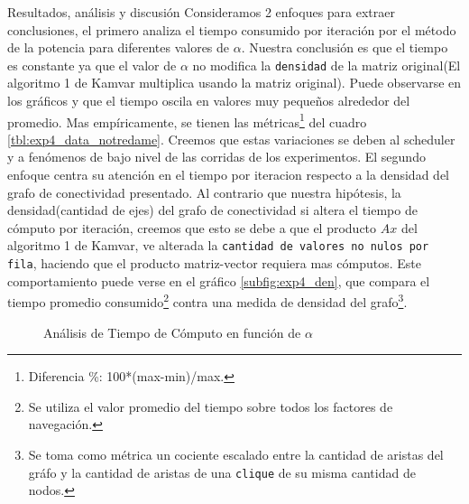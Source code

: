 \begin{LaTeXdescription}
    \item[Resultados, an\'alisis y discusi\'on]
        Consideramos 2 enfoques para extraer conclusiones, el primero analiza el
        tiempo consumido por iteración por el método de la potencia para diferentes
        valores de $\alpha$. Nuestra conclusión es que el tiempo es constante ya que
        el valor de $\alpha$ no modifica la \texttt{densidad} de la matriz
        original(El algoritmo 1 de Kamvar multiplica usando la matriz original).
        Puede observarse en los gráficos \label{subfig:exp4_tiempo_iteracion} y
        \label{subfig:exp4_tiempo_iteracion_log} que el tiempo oscila en valores muy
        pequeños alrededor del promedio. Mas empíricamente, se tienen las
        métricas\footnote{Diferencia \%: 100*(max-min)/max.} del cuadro
        \ref{tbl:exp4_data_notredame}. Creemos que estas variaciones se deben al
        scheduler y a fenómenos de bajo nivel de las corridas de los
        experimentos. El segundo enfoque centra su atención en el tiempo por
        iteracion respecto a la densidad del grafo de conectividad presentado.
        Al contrario que nuestra hipótesis, la densidad(cantidad de ejes) del
        grafo de conectividad si altera el tiempo de cómputo por iteración,
        creemos que esto se debe a que el producto $Ax$ del algoritmo 1 de
        Kamvar, ve alterada la \texttt{cantidad de valores no nulos por fila},
        haciendo que el producto matriz-vector requiera mas cómputos. Este
        comportamiento puede verse en el gráfico \ref{subfig:exp4_den}, que
        compara el tiempo promedio consumido\footnote{Se utiliza el valor
        promedio del tiempo sobre todos los factores de navegación.} contra una
        medida de densidad del grafo\footnote{Se toma como métrica un cociente
        escalado entre la cantidad de aristas del gráfo y la cantidad de aristas
        de una \texttt{clique} de su misma cantidad de nodos.}.
\end{LaTeXdescription}


\begin{figure}[H]
    \centering
    \caption{An\'alisis de Tiempo de C\'omputo en funci\'on de $\alpha$}
\end{figure}

